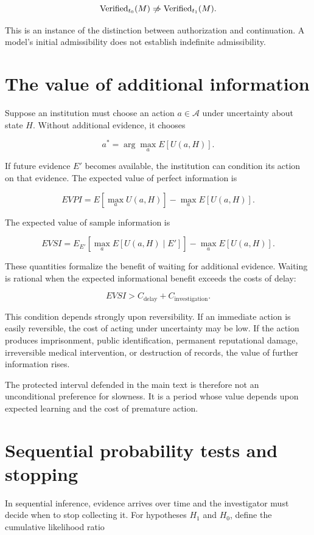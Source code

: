 \[
\operatorname{Verified}_{t_0}(M)
\centernot\Rightarrow
\operatorname{Verified}_{t_1}(M).
\]

This is an instance of the distinction between authorization and continuation. A model's initial admissibility does not establish indefinite admissibility.

\section{The value of additional information}
\label{sec:a26}

Suppose an institution must choose an action \(a\in\mathcal A\) under uncertainty about state \(H\). Without additional evidence, it chooses

\[
a^\ast
=
\arg\max_a
E[U(a,H)].
\]

If future evidence \(E'\) becomes available, the institution can condition its action on that evidence. The expected value of perfect information is

\[
EVPI
=
E\left[
\max_a U(a,H)
\right]
-
\max_aE[U(a,H)].
\]

The expected value of sample information is

\[
EVSI
=
E_{E'}\left[
\max_aE[U(a,H)\mid E']
\right]
-
\max_aE[U(a,H)].
\]

These quantities formalize the benefit of waiting for additional evidence. Waiting is rational when the expected informational benefit exceeds the costs of delay:

\[
EVSI
>
C_{\mathrm{delay}}+C_{\mathrm{investigation}}.
\]

This condition depends strongly upon reversibility. If an immediate action is easily reversible, the cost of acting under uncertainty may be low. If the action produces imprisonment, public identification, permanent reputational damage, irreversible medical intervention, or destruction of records, the value of further information rises.

The protected interval defended in the main text is therefore not an unconditional preference for slowness. It is a period whose value depends upon expected learning and the cost of premature action.

\section{Sequential probability tests and stopping}
\label{sec:a27}

In sequential inference, evidence arrives over time and the investigator must decide when to stop collecting it. For hypotheses \(H_1\) and \(H_0\), define the cumulative likelihood ratio

